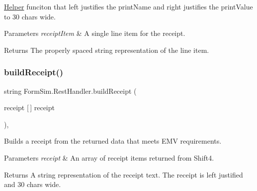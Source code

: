 \mbox{\hyperlink{class_form_sim_1_1_helper}{Helper}} funciton that left justifies the print\+Name and right justifies the print\+Value to 30 chars wide. 


\begin{DoxyParams}{Parameters}
{\em receipt\+Item} & A single line item for the receipt.\\
\hline
\end{DoxyParams}
\begin{DoxyReturn}{Returns}
The properly spaced string representation of the line item.
\end{DoxyReturn}
\mbox{\label{class_form_sim_1_1_rest_handler_ab10dcc5c39fdf95b190ed6b50d6e1ce6}} 
\subsubsection{\texorpdfstring{build\+Receipt()}{buildReceipt()}}
{\footnotesize\ttfamily string Form\+Sim.\+Rest\+Handler.\+build\+Receipt (\begin{DoxyParamCaption}\item[{receipt \mbox{[}$\,$\mbox{]}}]{receipt }\end{DoxyParamCaption})\hspace{0.3cm}{\ttfamily [inline]}, {\ttfamily [private]}}



Builds a receipt from the returned data that meets E\+MV requirements. 


\begin{DoxyParams}{Parameters}
{\em receipt} & An array of receipt items returned from Shift4.\\
\hline
\end{DoxyParams}
\begin{DoxyReturn}{Returns}
A string representation of the receipt text. The receipt is left justified and 30 chars wide.
\end{DoxyReturn}
\mbox{\label{class_form_sim_1_1_rest_handler_a08ab06f861daa5acaf1aca9ea2fe8c9b}} 
